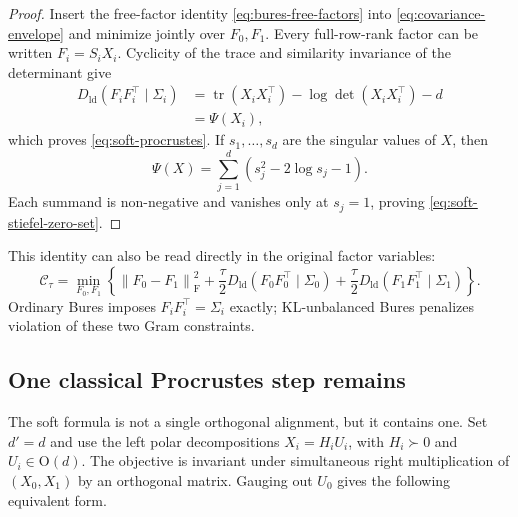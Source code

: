 \documentclass[11pt]{article}
\theoremstyle{definition}
\theoremstyle{remark}
\newcommand{\tr}{\operatorname{tr}}
\newcommand{\norm}[1]{\left\lVert #1\right\rVert}
\begin{document}
\begin{proof}
Insert the free-factor identity \eqref{eq:bures-free-factors} into
\eqref{eq:covariance-envelope} and minimize jointly over $F_0,F_1$. Every
full-row-rank factor can be written $F_i=S_iX_i$. Cyclicity of the trace and
similarity invariance of the determinant give
\begin{align*}
 D_{\mathrm{ld}}(F_iF_i^\top\mid\Sigma_i)
 &=\tr(X_iX_i^\top)-\log\det(X_iX_i^\top)-d\\
 &=\Psi(X_i),
\end{align*}
which proves \eqref{eq:soft-procrustes}. If $s_1,\ldots,s_d$ are the singular
values of $X$, then
\[
 \Psi(X)=\sum_{j=1}^d(s_j^2-2\log s_j-1).
\]
Each summand is non-negative and vanishes only at $s_j=1$, proving
\eqref{eq:soft-stiefel-zero-set}.
\end{proof}

This identity can also be read directly in the original factor variables:
\begin{equation}\label{eq:penalized-gram-procrustes}
 \mathcal C_\tau
 =\min_{F_0,F_1}
 \left\{
   \norm{F_0-F_1}_{\mathrm F}^2
   +\frac\tau2D_{\mathrm{ld}}(F_0F_0^\top\mid\Sigma_0)
   +\frac\tau2D_{\mathrm{ld}}(F_1F_1^\top\mid\Sigma_1)
 \right\}.
\end{equation}
Ordinary Bures imposes $F_iF_i^\top=\Sigma_i$ exactly; KL-unbalanced Bures
penalizes violation of these two Gram constraints.

\subsection{One classical Procrustes step remains}

The soft formula is not a single orthogonal alignment, but it contains one.
Set $d'=d$ and use the left polar decompositions $X_i=H_iU_i$, with
$H_i\succ0$ and $U_i\in\mathrm O(d)$. The objective is invariant under
simultaneous right multiplication of $(X_0,X_1)$ by an orthogonal matrix.
Gauging out $U_0$ gives the following equivalent form.
\end{document}
